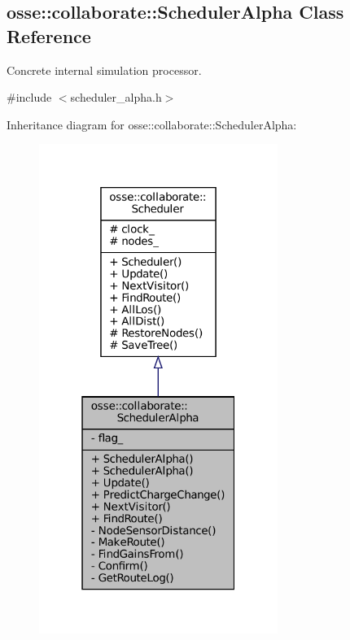 \hypertarget{classosse_1_1collaborate_1_1_scheduler_alpha}{}\subsection{osse\+:\+:collaborate\+:\+:Scheduler\+Alpha Class Reference}
\label{classosse_1_1collaborate_1_1_scheduler_alpha}


Concrete internal simulation processor.  




{\ttfamily \#include $<$scheduler\+\_\+alpha.\+h$>$}



Inheritance diagram for osse\+:\+:collaborate\+:\+:Scheduler\+Alpha\+:
\nopagebreak
\begin{figure}[H]
\begin{center}
\leavevmode
\includegraphics[width=220pt]{classosse_1_1collaborate_1_1_scheduler_alpha__inherit__graph}
\end{center}
\end{figure}
